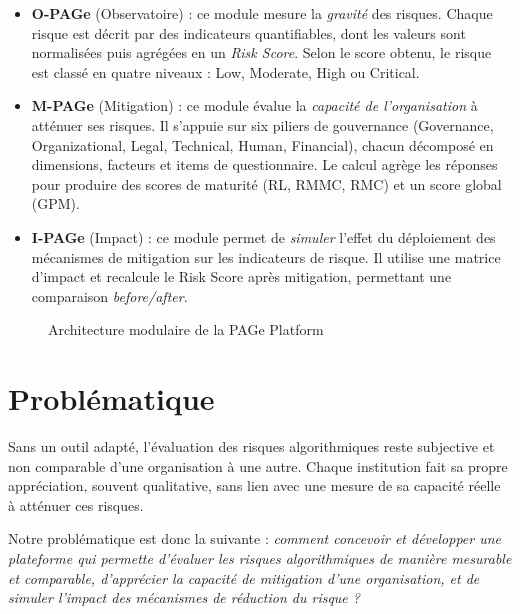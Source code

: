 \begin{itemize}
    \item \textbf{O-PAGe} (Observatoire) : ce module mesure la \textit{gravité} des risques. Chaque risque est décrit par des indicateurs quantifiables, dont les valeurs sont normalisées puis agrégées en un \textit{Risk Score}. Selon le score obtenu, le risque est classé en quatre niveaux : Low, Moderate, High ou Critical.

    \item \textbf{M-PAGe} (Mitigation) : ce module évalue la \textit{capacité de l'organisation} à atténuer ses risques. Il s'appuie sur six piliers de gouvernance (Governance, Organizational, Legal, Technical, Human, Financial), chacun décomposé en dimensions, facteurs et items de questionnaire. Le calcul agrège les réponses pour produire des scores de maturité (RL, RMMC, RMC) et un score global (GPM).

    \item \textbf{I-PAGe} (Impact) : ce module permet de \textit{simuler} l'effet du déploiement des mécanismes de mitigation sur les indicateurs de risque. Il utilise une matrice d'impact et recalcule le Risk Score après mitigation, permettant une comparaison \textit{before/after}.
\end{itemize}

\begin{figure}[h!]
\centering
\caption{Architecture modulaire de la PAGe Platform}
\end{figure}
\vspace{4cm}
\section{Problématique}
Sans un outil adapté, l'évaluation des risques algorithmiques reste subjective et non comparable d'une organisation à une autre. Chaque institution fait sa propre appréciation, souvent qualitative, sans lien avec une mesure de sa capacité réelle à atténuer ces risques.

Notre problématique est donc la suivante : \textit{comment concevoir et développer une plateforme qui permette d'évaluer les risques algorithmiques de manière mesurable et comparable, d'apprécier la capacité de mitigation d'une organisation, et de simuler l'impact des mécanismes de réduction du risque ?}
